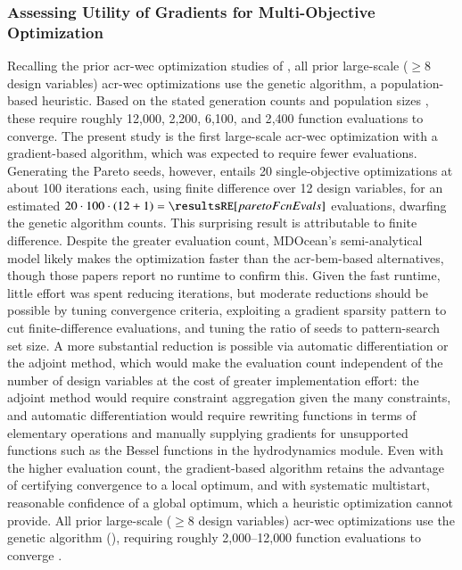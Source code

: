 \subsubsection{Assessing Utility of Gradients for Multi-Objective Optimization}
\ifdefined\DISSERTATION
    Recalling the prior \gls{acr-wec} optimization studies of , all prior large-scale ($\geq 8$ design variables) \gls{acr-wec} optimizations use the genetic algorithm, a population-based heuristic.
    Based on the stated generation counts and population sizes \citep{khanal_multi-objective_2024,garcia-teruel_reliability-based_2021,cotten_multi-objective_2022,abdulkadir_control_2024}, these require roughly 12{,}000, 2{,}200, 6{,}100, and 2{,}400 function evaluations to converge.
    The present study is the first large-scale \gls{acr-wec} optimization with a gradient-based algorithm, which was expected to require fewer evaluations.
    Generating the Pareto seeds, however, entails 20 single-objective optimizations at about 100 iterations each, using finite difference over 12 design variables, for an estimated $20\cdot100\cdot(12+1)=\resultsRE[paretoFcnEvals]$ evaluations,  dwarfing the genetic algorithm counts.
    This surprising result is attributable to finite difference.
    Despite the greater evaluation count, MDOcean's semi-analytical model likely makes the optimization faster than the \gls{acr-bem}-based alternatives, though those papers report no runtime to confirm this.
    Given the fast runtime, little effort was spent reducing iterations, but moderate reductions should be possible by tuning convergence criteria, exploiting a gradient sparsity pattern to cut finite-difference evaluations, and tuning the ratio of seeds to pattern-search set size.
    A more substantial reduction is possible via automatic differentiation or the adjoint method, which would make the evaluation count independent of the number of design variables at the cost of greater implementation effort: the adjoint method would require constraint aggregation given the many constraints, and automatic differentiation would require rewriting functions in terms of elementary operations and manually supplying gradients for unsupported functions such as the Bessel functions in the hydrodynamics module.
    Even with the higher evaluation count, the gradient-based algorithm retains the advantage of certifying convergence to a local optimum, and with systematic multistart, reasonable confidence of a global optimum, which a heuristic optimization cannot provide.
\else
    All prior large-scale ($\geq 8$ design variables) \gls{acr-wec} optimizations use the genetic algorithm (), requiring roughly 2{,}000--12{,}000 function evaluations to converge \citep{khanal_multi-objective_2024,garcia-teruel_reliability-based_2021,cotten_multi-objective_2022,abdulkadir_control_2024}.
